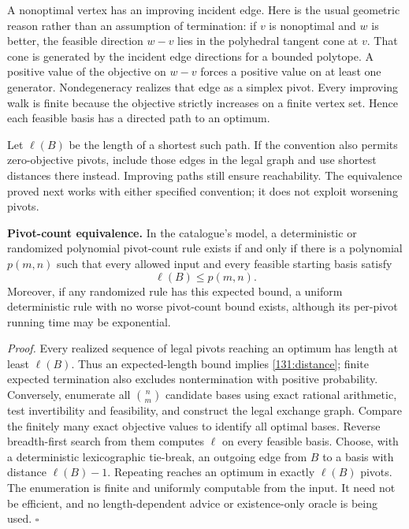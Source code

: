 \documentclass[11pt,a4paper]{article}
\numberwithin{equation}{section}
\begin{document}
A nonoptimal vertex has an improving incident edge.  Here is the usual
geometric reason rather than an assumption of termination: if $v$ is
nonoptimal and $w$ is better, the feasible direction $w-v$ lies in the
polyhedral tangent cone at $v$.  That cone is generated by the incident
edge directions for a bounded polytope.  A positive value of the
objective on $w-v$ forces a positive value on at least one generator.
Nondegeneracy realizes that edge as a simplex pivot.  Every improving
walk is finite because the objective strictly increases on a finite
vertex set.  Hence each feasible basis has a directed path to an optimum.

Let $\ell(B)$ be the length of a shortest such path.  If the convention
also permits zero-objective pivots, include those edges in the legal
graph and use shortest distances there instead.  Improving paths still
ensure reachability.  The equivalence proved next works with either
specified convention; it does not exploit worsening pivots.

\textbf{Pivot-count equivalence.}
In the catalogue's model, a deterministic or randomized polynomial
pivot-count rule exists if and only if there is a polynomial $p(m,n)$
such that every allowed input and every feasible starting basis satisfy
\begin{equation}\label{131:distance}
 \ell(B)\leq p(m,n).
\end{equation}
Moreover, if any randomized rule has this expected bound, a uniform
deterministic rule with no worse pivot-count bound exists, although
its per-pivot running time may be exponential.

\emph{Proof.} Every realized sequence of legal pivots reaching an
optimum has length at least $\ell(B)$.  Thus an expected-length bound
implies \eqref{131:distance}; finite expected termination also excludes
nontermination with positive probability.  Conversely, enumerate all
$\binom nm$ candidate bases using exact rational arithmetic, test
invertibility and feasibility, and construct the legal exchange graph.
Compare the finitely many exact objective values to identify all
optimal bases.  Reverse breadth-first search from them computes
$\ell$ on every feasible basis.  Choose, with a deterministic
lexicographic tie-break, an outgoing edge from $B$ to a basis with
distance $\ell(B)-1$.  Repeating reaches an optimum in exactly
$\ell(B)$ pivots.  The enumeration is finite and uniformly computable
from the input.  It need not be efficient, and no length-dependent
advice or existence-only oracle is being used. \hfill$\square$
\end{document}
